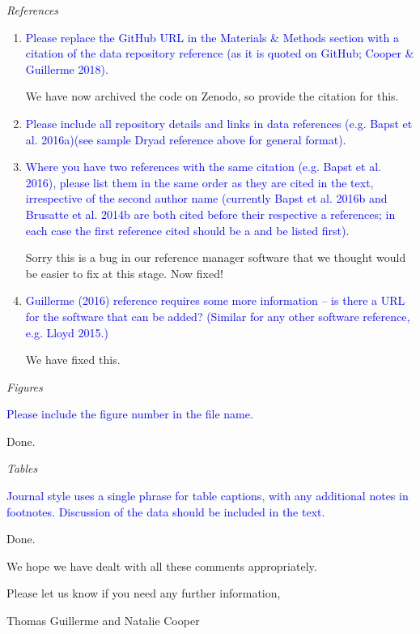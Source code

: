 \documentclass[12pt,letterpaper]{article}
\renewcommand{\subsection}[1]{%
\bigskip
\begin{center}
\begin{large}
\normalfont\itshape #1
\end{large}
\end{center}}
\begin{document}
\subsection{References}

\begin{enumerate}

\item{\textcolor{blue}{Please replace the GitHub URL in the Materials \& Methods section with a citation of the data repository reference (as it is quoted on GitHub; Cooper \& Guillerme 2018).}}

We have now archived the code on Zenodo, so provide the citation for this.

\item{\textcolor{blue}{Please include all repository details and links in data references (e.g. Bapst et al. 2016a)(see sample Dryad reference above for general format).}}

\item{\textcolor{blue}{Where you have two references with the same citation (e.g. Bapst et al. 2016), please list them in the same order as they are cited in the text, irrespective of the second author name (currently Bapst et al. 2016b and Brusatte et al. 2014b are both cited before their respective a references; in each case the first reference cited should be a and be listed first).}}

Sorry this is a bug in our reference manager software that we thought would be easier to fix at this stage. Now fixed!

\item{\textcolor{blue}{Guillerme (2016) reference requires some more information – is there a URL for the software that can be added? (Similar for any other software reference, e.g. Lloyd 2015.)}}

We have fixed this.

\end{enumerate}

\subsection{Figures}
\textcolor{blue}{Please include the figure number in the file name.}

Done.

\subsection{Tables}
\textcolor{blue}{Journal style uses a single phrase for table captions, with any additional notes in footnotes. Discussion of the data should be included in the text.}

Done.


We hope we have dealt with all these comments appropriately. 

Please let us know if you need any further information,

Thomas Guillerme and Natalie Cooper
\end{document}
